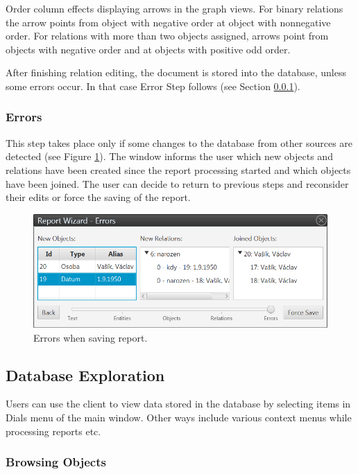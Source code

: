 Order column effects displaying arrows in the graph views. For binary
relations the arrow points from object with negative order at object with
nonnegative order. For relations with more than two objects assigned, arrows
point from objects with negative order and at objects with positive odd order.

After finishing relation editing, the document is stored into the database,
unless some errors occur. In that case Error Step follows (see Section
\ref{sssec:Errors}).

\subsubsection{Errors}
\label{sssec:Errors}

This step takes place only if some changes to the database from other sources
are detected (see Figure \ref{fig:Errors}). The window informs the user which
new objects and relations have been created since the report processing started
and which objects have been joined. The user can decide to return to previous steps and reconsider their edits or force the saving of the report.

\begin{figure}[!htb]
        \centering
        \includegraphics[width=\textwidth]{Images/errors}
        \caption{Errors when saving report.}
        \label{fig:Errors}
\end{figure}

\subsection{Database Exploration}
\label{ssec:ViewDatabase}

Users can use the client to view data stored in the database by selecting items
in Dials menu of the main window. Other ways include various context menus
while processing reports etc.

\subsubsection{Browsing Objects}
\label{sssec:ObjectList}

